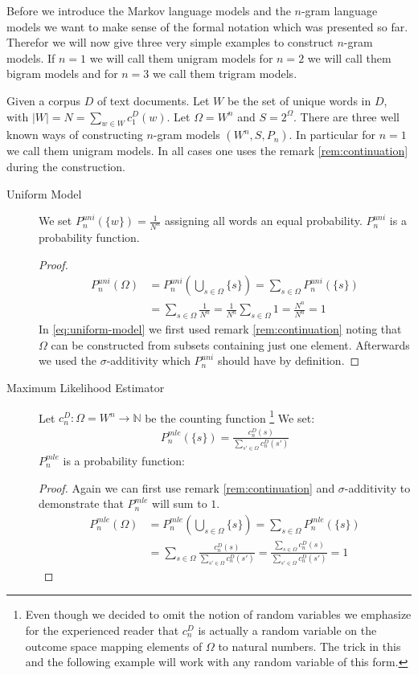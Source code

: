 \documentclass[•]{book}
\begin{document}
Before we introduce the Markov language models and the $n$-gram language models we want to make sense of the formal notation which was presented so far.
Therefor we will now give three very simple examples to construct $n$-gram models. If $n=1$ we will call them unigram models for $n=2$ we will call them bigram models and for $n=3$ we call them trigram models. 

\begin{example}\label{ex:unigram-model}
Given a corpus $D$ of text documents. Let $W$ be the set of unique words in $D$, with $|W|=N=\sum_{w\in W}c_1^D(w)$. Let $\Omega=W^n$ and $S=2^{\Omega}$. There are three well known ways of constructing $n$-gram models $(W^n,S,P_n)$. In particular for $n=1$ we call them unigram models. In all cases one uses the remark \ref{rem:continuation} during the construction. 
\begin{description}
\item[Uniform Model] We set $P_n^{uni}(\{w\})=\frac{1}{N^n}$ assigning all words an equal probability.  $P_n^{uni}$ is a probability function. 
\begin{proof}
\begin{align}
P_n^{uni}(\Omega) & = P_n^{uni}(\bigcup_{s\in\Omega}\{s\}) = \sum\limits_{s\in\Omega}P_n^{uni}(\{s\}) \label{eq:uniform-model}\\
 &  = \sum\limits_{s\in\Omega}\frac{1}{N^n}  =  \frac{1}{N^n} \sum\limits_{s\in\Omega}1= \frac{N^n}{N^n} = 1 
\end{align}
In \ref{eq:uniform-model} we first used remark \ref{rem:continuation} noting that $\Omega$ can be constructed from subsets containing just one element. 
Afterwards we used the $\sigma$-additivity which $P_n^{uni}$ should have by definition. 
\end{proof}

\item[Maximum Likelihood Estimator]  Let $c_n^D:\Omega = W^n\longrightarrow\mathbb{N}$ be the counting function \footnote{Even though we decided to omit the notion of random variables we emphasize for the experienced reader that $c_n^D$ is actually a random variable on the outcome space mapping elements of $\Omega$ to natural numbers. The trick in this and the following example will work with any random variable of this form.} We set: 
\begin{align}
P_n^{mle}(\{s\})=\frac{c_n^D(s)}{\sum\limits_{s'\in \Omega}c_n^D(s')}
\end{align}
$P_n^{mle}$ is a probability function:
\begin{proof}
Again we can first use remark \ref{rem:continuation} and $\sigma$-additivity to demonstrate that $P_n^{mle}$ will sum to $1$. 
\begin{align}
P_n^{mle}(\Omega) & = P_n^{mle}(\bigcup_{s\in\Omega}\{s\}) = \sum\limits_{s\in\Omega}P_n^{mle}(\{s\} )  \\
& =  \sum\limits_{s\in\Omega} \frac{c_n^D(s)}{\sum\limits_{s'\in \Omega}c_n^D(s')} = \frac{\sum\limits_{s\in \Omega}c_n^D(s)}{\sum\limits_{s'\in \Omega}c_n^D(s')} = 1
\end{align}
\end{proof}


\end{description}
\end{example}
\end{document}
